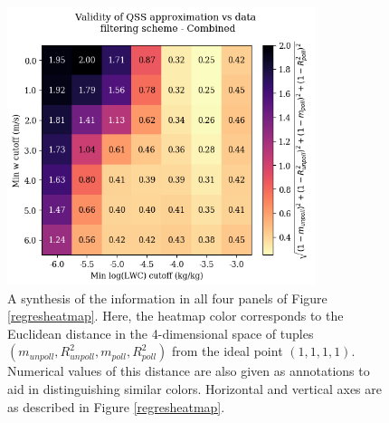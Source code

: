 \documentclass{article}
\begin{document}
\begin{figure}[ht]
    \centering
    \includegraphics[width=9cm]{revmywrf/v1_FINAL_from_data_dist_heatmap_figure.png}
    \caption{A synthesis of the information in all four panels of Figure \ref{regresheatmap}. Here, the heatmap color corresponds to the Euclidean distance in the 4-dimensional space of tuples $(m_{unpoll}, R^2_{unpoll}, m_{poll}, R^2_{poll})$ from the ideal point $(1, 1, 1, 1)$. Numerical values of this distance are also given as annotations to aid in distinguishing similar colors. Horizontal and vertical axes are as described in Figure \ref{regresheatmap}.}
    \label{distheatmap}
\end{figure}
\end{document}
